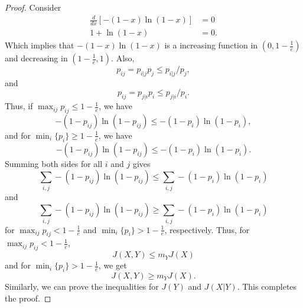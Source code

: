 \documentclass[10pt,a4paper]{amsart}
\begin{document}
\begin{proof}
    Consider 
    \begin{equation}
        \begin{split}
            \frac{d}{dx}\left[-\left(1-x \right) \ln\left(1-x \right)\right]&=0 \\
            1+\ln\left(1-x \right)&=0.
        \end{split}
    \end{equation}
Which implies that $-\left(1-x \right) \ln\left(1-x \right)$ is a increasing function in $\left(0, 1-\frac{1}{e}\right)$ and decreasing in $\left(1-\frac{1}{e},1\right)$. Also, 
\begin{equation}
p_{ij}=p_{i|j}p_j\leq p_{i|j}/ p_{j},
\end{equation}
and
\begin{equation}
p_{ij}=p_{j|i}p_i\leq p_{j|i}/ p_{i}.
\end{equation}
Thus, if $\max_{ij}p_{ij}\leq1-\frac{1}{e}$, we have 
\begin{equation}
    -\left(1-p_{ij} \right)\ln\left(1-p_{ij} \right)\leq -\left(1-p_{i} \right)\ln\left(1-p_{i} \right),
\end{equation}
and 
for $\min_{i}\{p_i\}\geq1-\frac{1}{e}$, we have
\begin{equation}
    -\left(1-p_{ij} \right)\ln\left(1-p_{ij} \right)\leq -\left(1-p_{i} \right)\ln\left(1-p_{i} \right).
\end{equation}
Summing both sides for all $i$ and $j$ gives
\begin{equation}
    \sum_{i,j}-\left(1-p_{ij} \right)\ln\left(1-p_{ij} \right)\leq\sum_{i,j} -\left(1-p_{i} \right)\ln\left(1-p_{i} \right)
\end{equation}
and 
\begin{equation}
    \sum_{i,j}-\left(1-p_{ij} \right)\ln\left(1-p_{ij} \right)\geq\sum_{i,j} -\left(1-p_{i} \right)\ln\left(1-p_{i} \right)
\end{equation}
for $\max_{ij}p_{ij}<1-\frac{1}{e}$ and $\min_{i}\{p_i\}>1-\frac{1}{e}$, respectively. Thus, for $\max_{ij}p_{ij}<1-\frac{1}{e}$,
\begin{equation}
    J\left(X,Y \right)\leq m_Y J\left(X \right)
\end{equation}
and for $\min_{i}\{p_i\}> 1-\frac{1}{e}$, we get
\begin{equation}
    J\left(X,Y \right)\geq m_Y J\left(X \right).
\end{equation}
Similarly, we can prove the inequalities for $J(Y)$ and $J(X|Y)$. This completes the proof.
\end{proof}
\end{document}
